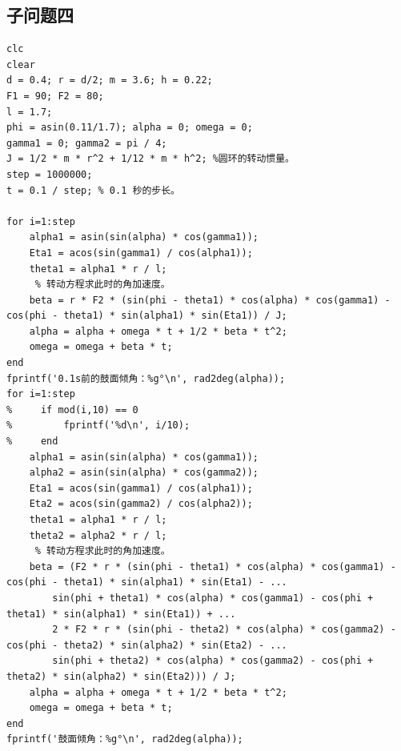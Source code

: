 \documentclass{cumcm}
\begin{document}
\subsection{子问题四}
\begin{lstlisting}
clc
clear
d = 0.4; r = d/2; m = 3.6; h = 0.22;
F1 = 90; F2 = 80;
l = 1.7;
phi = asin(0.11/1.7); alpha = 0; omega = 0;
gamma1 = 0; gamma2 = pi / 4;
J = 1/2 * m * r^2 + 1/12 * m * h^2; %圆环的转动惯量。
step = 1000000;
t = 0.1 / step; % 0.1 秒的步长。

for i=1:step
    alpha1 = asin(sin(alpha) * cos(gamma1));
    Eta1 = acos(sin(gamma1) / cos(alpha1));
    theta1 = alpha1 * r / l;
     % 转动方程求此时的角加速度。
    beta = r * F2 * (sin(phi - theta1) * cos(alpha) * cos(gamma1) - cos(phi - theta1) * sin(alpha1) * sin(Eta1)) / J;
    alpha = alpha + omega * t + 1/2 * beta * t^2;
    omega = omega + beta * t;
end
fprintf('0.1s前的鼓面倾角：%g°\n', rad2deg(alpha));
for i=1:step
%     if mod(i,10) == 0
%         fprintf('%d\n', i/10);
%     end
    alpha1 = asin(sin(alpha) * cos(gamma1));
    alpha2 = asin(sin(alpha) * cos(gamma2));
    Eta1 = acos(sin(gamma1) / cos(alpha1));
    Eta2 = acos(sin(gamma2) / cos(alpha2));
    theta1 = alpha1 * r / l;
    theta2 = alpha2 * r / l;
     % 转动方程求此时的角加速度。
    beta = (F2 * r * (sin(phi - theta1) * cos(alpha) * cos(gamma1) - cos(phi - theta1) * sin(alpha1) * sin(Eta1) - ...
        sin(phi + theta1) * cos(alpha) * cos(gamma1) - cos(phi + theta1) * sin(alpha1) * sin(Eta1)) + ...
        2 * F2 * r * (sin(phi - theta2) * cos(alpha) * cos(gamma2) - cos(phi - theta2) * sin(alpha2) * sin(Eta2) - ...
        sin(phi + theta2) * cos(alpha) * cos(gamma2) - cos(phi + theta2) * sin(alpha2) * sin(Eta2))) / J;
    alpha = alpha + omega * t + 1/2 * beta * t^2;
    omega = omega + beta * t;
end
fprintf('鼓面倾角：%g°\n', rad2deg(alpha));
\end{lstlisting}
\end{document}
